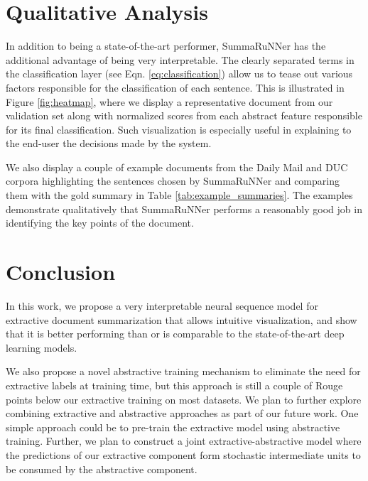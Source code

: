 \documentclass[letterpaper]{article}
\begin{document}
\section{Qualitative Analysis}
In addition to being a state-of-the-art performer, SummaRuNNer has the additional advantage of being very interpretable. The clearly separated terms in the classification layer (see Eqn. \ref{eq:classification}) allow us to tease out various factors responsible for the classification of each sentence. This is illustrated in Figure \ref{fig:heatmap}, where we display a representative document from our validation set along with normalized scores from each abstract feature responsible for its final classification. Such visualization is especially useful in explaining to the end-user the decisions made by the system.

We also display a couple of example documents from the Daily Mail and DUC corpora highlighting the sentences chosen by SummaRuNNer and comparing them with the gold summary in Table \ref{tab:example_summaries}. The examples demonstrate qualitatively that SummaRuNNer performs a reasonably good job in identifying the key points of the document.



\section{Conclusion}
In this work, we propose a very interpretable neural sequence model for extractive document summarization that allows intuitive visualization, and show that it is better performing than or is comparable to the state-of-the-art deep learning models. 

We also propose a novel abstractive training mechanism to eliminate the need for extractive labels at training time, but this approach is still a couple of Rouge points below our extractive training on most datasets. We plan to further explore combining extractive and abstractive approaches as part of our future work. One simple approach could be to pre-train the extractive model using abstractive training. Further, we plan to construct a joint extractive-abstractive model where the predictions of our extractive component form stochastic intermediate units to be consumed by the abstractive component.
\end{document}
